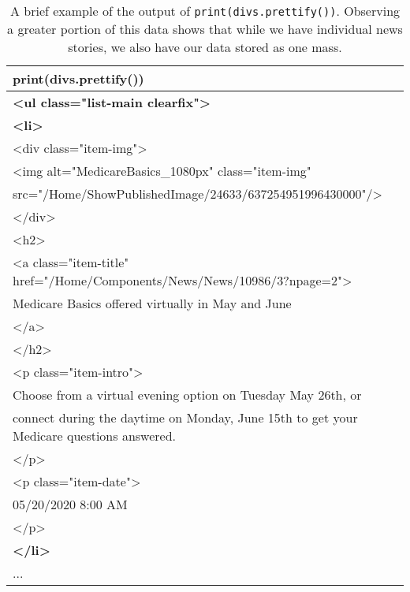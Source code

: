 \documentclass[]{article}
\newcommand{\code}[1]{\colorbox{light-gray}{\texttt{#1}}}
\begin{document}
\begin{table}[!ht]
	\begin{center}
		\caption{A brief example of the output of \code{print(divs.prettify())}.  Observing a greater portion of this data shows that while we have individual news stories, we also have our data stored as one mass.}
		\label{tab:table1}
		\begin{tabular}{|l|} 
			\hline
			\textbf{print(divs.prettify())} \\
			\hline
			\textbf{<ul class="list-main clearfix">}\\
			\textbf{<li>}\\
			<div class="item-img">\\
			<img alt="MedicareBasics\_1080px" class="item-img"\\ src="/Home/ShowPublishedImage/24633/637254951996430000"/>\\
			</div>\\
			<h2>\\
			<a class="item-title" href="/Home/Components/News/News/10986/3?npage=2">\\
			Medicare Basics offered virtually in May and June\\
			</a>\\
			</h2>\\
			<p class="item-intro">\\
			Choose from a virtual evening option on Tuesday May 26th, or \\
			connect during the daytime on Monday, June 15th to get your Medicare questions answered.\\
			</p>\\
			<p class="item-date">\\
			05/20/2020 8:00 AM\\
			</p>\\
			\textbf{</li>}\\
			...\\
			\hline
		\end{tabular}
	\end{center}
\end{table}
\end{document}
